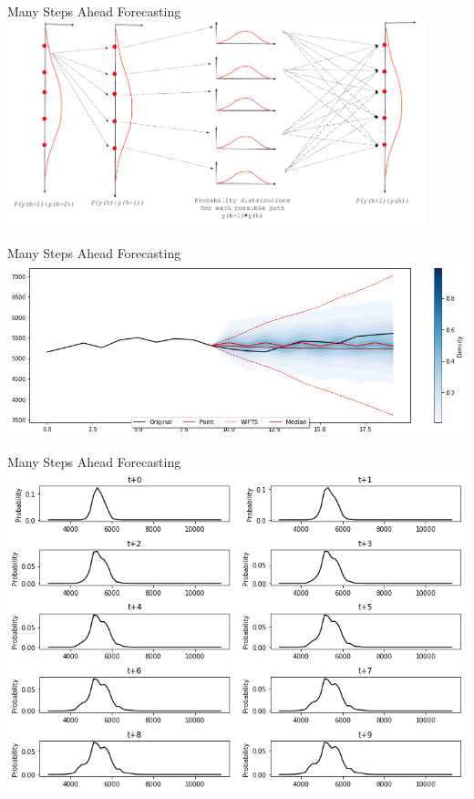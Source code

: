 \documentclass{beamer}
\begin{document}
\begin{frame}{Many Steps Ahead Forecasting}
\includegraphics[width=\textwidth,height=6cm]{figures/pwfts_probabilistic_manysteps.pdf}
\end{frame}


\begin{frame}{Many Steps Ahead Forecasting}
\includegraphics[width=\textwidth]{figures/pwfts_sample_manystep.png}
\end{frame}

\begin{frame}{Many Steps Ahead Forecasting}
\includegraphics[width=\textwidth]{figures/pwfts_sample_manystep_tiled.png}
\end{frame}
\end{document}
